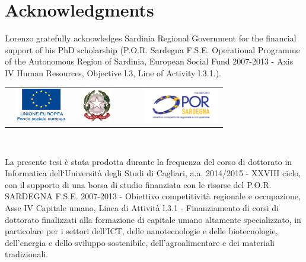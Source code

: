 \documentclass[final,a4paper,12pt,english]{UnicaPhdThesis3}
\begin{document}
\newpage
\section*{Acknowledgments} Lorenzo gratefully acknowledges Sardinia Regional Government for the financial support of his PhD scholarship (P.O.R. Sardegna F.S.E.  Operational Programme of the Autonomous Region of Sardinia, European Social Fund 2007-2013  - Axis IV Human Resources, Objective l.3, Line of Activity l.3.1.).

\vspace{1cm}
\begin{minipage}[t]{1\textwidth}
\begin{center}
\begin{tabular}[t]{cccccccc}%
\hspace{-1.2cm}
&
\includegraphics[height=15mm]{./images/UE.png}
&
\hspace{0.8cm}
&
\includegraphics[height=15mm]{./images/MIUR.png}
&
\hspace{0.6cm}
&
&
\hspace{0.6cm}
&
\includegraphics[height=15mm]{./images/POR.png}
\end{tabular}\\[2em]\mbox{}
\end{center}
\end{minipage}

La presente tesi è stata prodotta durante la frequenza del corso di dottorato in Informatica dell‘Universit\`a degli Studi di Cagliari, a.a. 2014/2015 - XXVIII ciclo, con il supporto di una borsa di studio finanziata con le risorse del P.O.R. SARDEGNA F.S.E. 2007-2013 - Obiettivo competitivit\`a regionale e occupazione, Asse IV Capitale umano, Linea di  Attivit\`a l.3.1 - Finanziamento di corsi di dottorato finalizzati alla formazione di capitale umano altamente specializzato, in particolare per i settori dell'ICT, delle nanotecnologie e delle biotecnologie, dell'energia e dello sviluppo sostenibile, dell'agroalimentare e dei materiali tradizionali.
\end{document}
